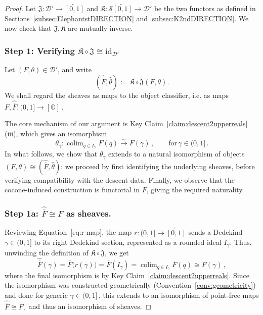 \documentclass[a4paper, 11pt,reqno]{amsart}
\newcommand{\id}{\mathrm{id}}
\newcommand{\D}{\mathcal{D}}
\newcommand{\OC}{{{[\mathbb{O}]}}}
\newcommand{\J}{\mathfrak{J}}
\newcommand{\K}{\mathfrak{K}}
\DeclareMathOperator*{\colim}{colim}
\begin{document}
\begin{proof} Let $\J\colon\mathcal{D}'\rightarrow \overleftarrow{[0,1]}$ and $\K\colon\mathcal{S}\overleftarrow{[0,1]}\rightarrow\mathcal{D}'$ be the two functors as defined in Sections~\ref{subsec:ElephantstDIRECTION} and \ref{subsec:K2ndDIRECTION}. We now check that $\J,\K$ are mutually inverse.
	
	\subsubsection*{Step 1: Verifying $\K\circ\J\cong\id_{\D'}$} Let $(F,\theta)\in\mathcal{D}'$, and write
$$(\widehat{\overline{F}},\widehat{\theta}):=\K\circ\J(F,\theta).$$
We shall regard the sheaves as maps to the object classifier, i.e. as maps $F,\widehat{\overline{F}}\colon (0,1]\to\OC\,.$

The core mechanism of our argument is  Key Claim~\ref{claim:descent2upperreals} (iii), which gives an isomorphism
	\[\theta_\gamma \colon \colim_{q\in I_\gamma}F(q)\xrightarrow{\sim} F(\gamma)\,,\qquad\text{for}\, \gamma\in (0,1]\,.\] 
In what follows, we show that $\theta_{\gamma}$ extends to a natural isomorphism of objects $(F,\theta)\cong(\widehat{\overline{F}},\widehat{\theta})$: we proceed by first identifying the underlying sheaves, before verifying compatibility with the descent data. Finally, we observe that the cocone-induced construction is functorial in $F$, giving the required naturality.

 
 
\subsubsection*{Step 1a: $\widehat{\overline{F}}\cong F$ as sheaves.}

Reviewing Equation~\eqref{eq:r-map}, the map $r\colon (0,1]\to \overleftarrow{[0,1]}$ sends a Dedekind $\gamma\in (0,1]$ to its right Dedekind section, represented as a rounded ideal $I_{\gamma}$. Thus, unwinding the definition of $\mathfrak K\circ\mathfrak J$, we get	
\[\widehat{\overline{F}}(\gamma)=\overline{F}\big(r(\gamma)\big) = \overline{F}(I_\gamma)= \displaystyle\colim_{q\in I_\gamma}F(q)\cong F(\gamma)\,,\]
 where the final isomorphism is by Key Claim~\ref{claim:descent2upperreals}. Since the isomorphism was constructed geometrically  (Convention~\ref{conv:geometricity}) and done for generic $\gamma\in (0,1]\,$, this extends to an isomorphism of point-free maps $\widehat{\overline F}\cong F,$ and thus an isomorphism of sheaves.



\end{proof}
\end{document}
